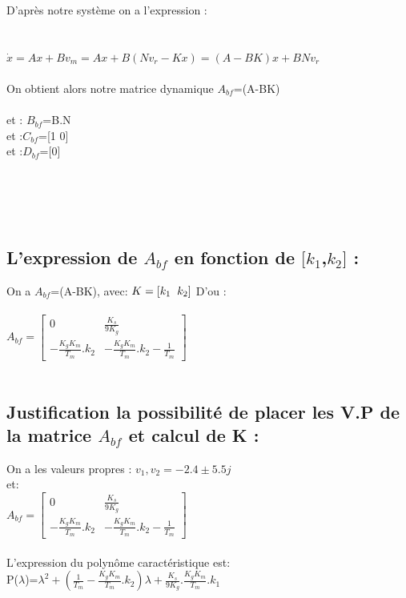 \documentclass[12pt, a4paper, openany]{report}
\begin{document}
D'après notre système on a l'expression :\\
\\\\
$\dot{x}=Ax+Bv_{m}=Ax+B(Nv_{r}-Kx)=(A-BK)x+BNv_{r}$
\\\\
On obtient alors notre matrice dynamique \quad $A_{bf}$=(A-BK)\\
\\
et : \quad $B_{bf}$=B.N \\
 et :\quad $C_{bf}$=[1 0] \\
 et :\quad $D_{bf}$=[0] \\\\\\\\\\

\subsection{L'expression de $A_{bf}$ en fonction de $[k_{1}$,$k_{2}]$ : }

On a $A_{bf}$=(A-BK),  avec: $K=[k_{1} \hspace{2mm} k_{2}]$
D'ou :\\\\
$A_{bf}=
\begin{bmatrix} 
0 & \frac{K_{s}}{9K_{g}} \\
-\frac{K_{g}K_{m}}{T_{m}}.k_{2} & -\frac{K_{g}K_{m}}{T_{m}}.k_{2}-\frac{1}{T_{m}}
\end{bmatrix}$ \\\\

\subsection{Justification la possibilité de placer les V.P de la matrice $A_{bf}$ et calcul de K :}

On a les valeurs propres : $v_{1},v_{2}=-2.4\pm5.5j$ \\
et:\\
$A_{bf}=
\begin{bmatrix} 
0 & \frac{K_{s}}{9K_{g}} \\
-\frac{K_{g}K_{m}}{T_{m}}.k_{2} & -\frac{K_{g}K_{m}}{T_{m}}.k_{2}-\frac{1}{T_{m}}
\end{bmatrix}$ \\\\

L'expression du polynôme caractéristique est:\\
P($\lambda$)=$\lambda^2+(\frac{1}{T_{m}}-\frac{K_{g}K_{m}}{T_{m}}.k_{2})\lambda+\frac{K_{s}}{9K_{g}}.\frac{K_{g}K_{m}}{T_{m}}.k_{1}$\\\\
\end{document}
